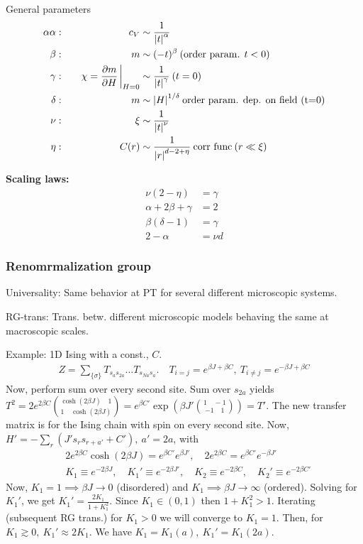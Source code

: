 \documentclass[a4paper, english, 12pt]{article}
\newcommand{\closed}[1]{\left( #1 \right)}
\newcommand{\curly}[1]{\{ #1 \} }
\begin{document}
\begin{multicols*}{2}
General parameters 
\begin{alignat*}
    \alpha \alpha: &&\quad c_V &\sim \frac{1}{\abs{t}^\alpha} \\ 
    \beta:&& \quad m &\sim (-t)^\beta\:(\text{order param. } t<0) \\ 
    \gamma:&& \quad \chi=\pdv{m}{H}\eval_{H=0} &\sim \frac{1}{\abs{t}^\gamma}\:(t=0) \\ 
    \delta:&& \quad m &\sim \abs{H}^{1/\delta}\: \text{order param. dep. on field (t=0)} \\
    \nu:&& \quad \xi &\sim \frac{1}{\abs{t}^\nu} \\ 
    \eta:&&\quad C(r) &\sim \frac{1}{\abs{r}^{d-2+\eta}}\:\text{corr func}\: (r\ll\xi)
\end{alignat*}

\textbf{Scaling laws:}
\begin{align*}
    \nu(2-\eta) &= \gamma \\
    \alpha + 2\beta + \gamma &= 2 \\
    \beta(\delta-1) &= \gamma \\ 
    2-\alpha &= \nu d
\end{align*}


\subsubsection*{\scriptsize Renomrmalization group}
Universality: Same behavior at PT for several different microscopic systems. 

RG-trans: Trans. betw. different microscopic models behaving the same at macroscopic scales. 

Example: 1D Ising with a const., $C$. 
\begin{align*}
    Z = \sum_{\curly{\sigma}} T_{s_a s_{2a}}\dots T_{s_{Na} s_a}. \quad T_{i=j}=e^{\beta J + \beta C},\:T_{i\neq j}=e^{-\beta J +\beta C}
\end{align*}
Now, perform sum over every second site. Sum over $s_{2a}$ yields $T^2=2e^{2\beta C} \binom{\cosh(2\beta J)\quad 1}{1\quad \cosh(2\beta J)}=e^{\beta C'} \exp\closed{\beta J'\binom{1 \quad -1}{-1 \quad 1}}=T'$. The new transfer matrix is for the Ising chain with spin on every second site. Now, $H'=-\sum_r (J' s_r s_{r+a'}+C'),\:a'=2a$, with 
\begin{align*}
    &2e^{2\beta C} \cosh(2\beta J) = e^{\beta C'} e^{\beta J'},\quad 2e^{2\beta C}=e^{\beta C'} e^{-\beta J'} \\ 
    &K_1 \equiv e^{-2\beta J},\quad K_1' \equiv e^{-2\beta J'},\quad K_2 \equiv e^{-2\beta C},\quad K_2' \equiv e^{-2\beta C'}
\end{align*} 
Now, $K_1=1\implies \beta J\to 0$ (disordered) and $K_1\implies \beta J\to\infty$ (ordered). Solving for $K_1'$, we get $K_1'=\frac{2K_1}{1+K_1^2}$. Since $K_1\in(0,1)$ then $1+K_1^2>1$. Iterating (subsequent RG trans.) for $K_1>0$ we will converge to $K_1=1$. Then, for $K_1\gtrsim0,\:K_1'\approx 2K_1$. We have $K_1=K_1(a),\: K_1'=K_1(2a)$. 


\end{multicols*}
\end{document}
